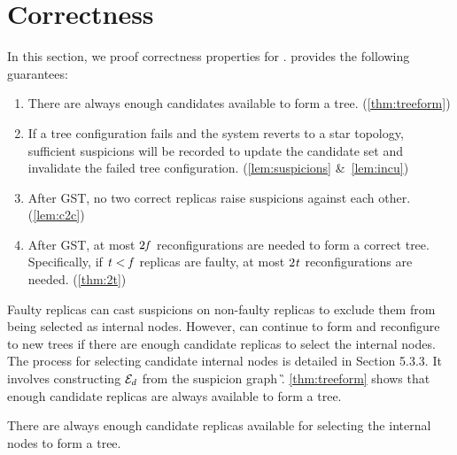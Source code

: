 \section{\optitree Correctness}
\label{sec:security_analysis}

In this section, we proof correctness properties for \optitree.
\optitree provides the following guarantees:
\begin{enumerate}[label=C\arabic*]
  \item\label{p:candidates} There are always enough candidates available to form a tree. (\cref{thm:treeform})
  \item\label{p:suspicions} If a tree configuration fails and the system reverts to a star topology, sufficient suspicions will be recorded to update the candidate set and invalidate the failed tree configuration. (\cref{lem:suspicions} \&~\ref{lem:incu})
  \item\label{p:no-susp} After GST, no two correct replicas raise suspicions against each other. (\cref{lem:c2c})
  \item\label{p:limit} After GST, at most $2\mathit{f}$ reconfigurations are needed to form a correct tree. Specifically, if $\mathit{t} < \mathit{f}$ replicas are faulty, at most $2\mathit{t}$ reconfigurations are needed. (\cref{thm:2t})
\end{enumerate}



\noindent
Faulty replicas can cast suspicions on non-faulty replicas to exclude them from being selected as internal nodes.
However, \optitree can continue to form and reconfigure to new trees if there are enough candidate replicas to select the internal nodes.
The process for selecting candidate internal nodes is detailed in Section 5.3.3.
It involves constructing $\mathcal{E}_d$ from the suspicion graph \G.
\cref{thm:treeform} shows that enough candidate replicas are always available to form a tree.

\begin{theorem}
  \label{thm:treeform}
  There are always enough candidate replicas available for selecting the internal nodes to form a tree.
\end{theorem}

